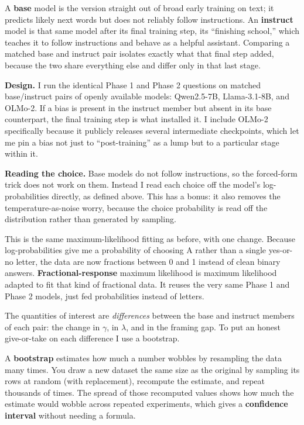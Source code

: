 \documentclass[11pt]{article}
\newcommand{\term}[1]{\textbf{\color{mossdk}#1}}
\begin{document}
\begin{defbox}
A \term{base} model is the version straight out of broad early training on text; it predicts likely next
words but does not reliably follow instructions. An \term{instruct} model is that same model after its
final training step, its ``finishing school,'' which teaches it to follow instructions and behave as a
helpful assistant. Comparing a matched base and instruct pair isolates exactly what that final step
added, because the two share everything else and differ only in that last stage.
\end{defbox}

\textbf{Design.} I run the identical Phase 1 and Phase 2 questions on matched base/instruct pairs of
openly available models: Qwen2.5-7B, Llama-3.1-8B, and OLMo-2. If a bias is present in the instruct
member but absent in its base counterpart, the final training step is what installed it. I include
OLMo-2 specifically because it publicly releases several intermediate checkpoints, which let me pin a
bias not just to ``post-training'' as a lump but to a particular stage within it.

\textbf{Reading the choice.} Base models do not follow instructions, so the forced-form trick does not
work on them. Instead I read each choice off the model's log-probabilities directly, as defined above.
This has a bonus: it also removes the temperature-as-noise worry, because the choice probability is read
off the distribution rather than generated by sampling.

\begin{defbox}
This is the same maximum-likelihood fitting as before, with one change. Because log-probabilities give me
a probability of choosing A rather than a single yes-or-no letter, the data are now fractions between 0
and 1 instead of clean binary answers. \term{Fractional-response} maximum likelihood is maximum
likelihood adapted to fit that kind of fractional data. It reuses the very same Phase 1 and Phase 2
models, just fed probabilities instead of letters.
\end{defbox}

The quantities of interest are \emph{differences} between the base and instruct members of each pair: the
change in $\gamma$, in $\lambda$, and in the framing gap. To put an honest give-or-take on each
difference I use a bootstrap.

\begin{defbox}
A \term{bootstrap} estimates how much a number wobbles by resampling the data many times. You draw a new
dataset the same size as the original by sampling its rows at random (with replacement), recompute the
estimate, and repeat thousands of times. The spread of those recomputed values shows how much the
estimate would wobble across repeated experiments, which gives a \term{confidence interval} without
needing a formula.
\end{defbox}
\end{document}
